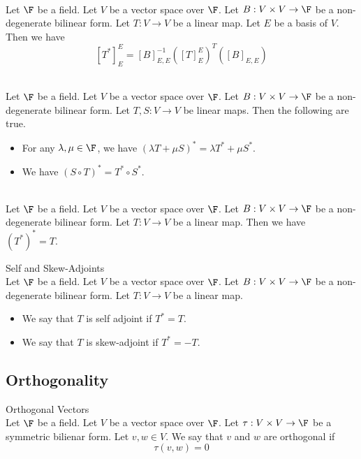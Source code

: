 \documentclass[a4paper]{article}
\begin{document}
\begin{prp}{}{}\\
Let $\F$ be a field. Let $V$ be a vector space over $\F$. Let $B:V\times V\to\F$ be a non-degenerate bilinear form. Let $T:V\to V$ be a linear map. Let $E$ be a basis of $V$. Then we have $$[T^\ast]_E^E=[B]_{E,E}^{-1}([T]_E^E)^T([B]_{E,E})$$
\end{prp}

\begin{prp}{}{}\\
Let $\F$ be a field. Let $V$ be a vector space over $\F$. Let $B:V\times V\to\F$ be a non-degenerate bilinear form. Let $T,S:V\to V$ be linear maps. Then the following are true. 
\begin{itemize}
\item For any $\lambda,\mu\in\F$, we have $(\lambda T+\mu S)^\ast=\lambda T^\ast+\mu S^\ast$. 
\item We have $(S\circ T)^\ast=T^\ast\circ S^\ast$. 
\end{itemize}
\end{prp}

\begin{prp}{}{}\\
Let $\F$ be a field. Let $V$ be a vector space over $\F$. Let $B:V\times V\to\F$ be a non-degenerate bilinear form. Let $T:V\to V$ be a linear map. Then we have $(T^\ast)^\ast=T$. 
\end{prp}

\begin{defn}{Self and Skew-Adjoints}{}\\
Let $\F$ be a field. Let $V$ be a vector space over $\F$. Let $B:V\times V\to\F$ be a non-degenerate bilinear form. Let $T:V\to V$ be a linear map. 
\begin{itemize}
\item We say that $T$ is self adjoint if $T^\ast=T$. 
\item We say that $T$ is skew-adjoint if $T^\ast=-T$. 
\end{itemize}
\end{defn}

\subsection{Orthogonality}
\begin{defn}{Orthogonal Vectors}{}\\
Let $\F$ be a field. Let $V$ be a vector space over $\F$. Let $\tau:V\times V\to\F$ be a symmetric bilienar form. Let $v,w\in V$. We say that $v$ and $w$ are orthogonal if $$\tau(v,w)=0$$
\end{defn}
\end{document}
